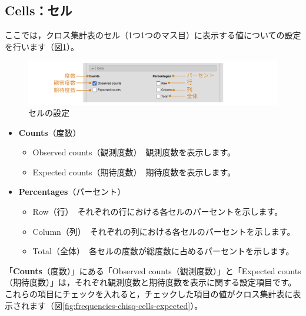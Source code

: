\documentclass[
  12pt,
  a5jpaper,
  lualatex, ja=standard]{bxjsbook}
\providecommand{\tightlist}{%
  \setlength{\itemsep}{0pt}\setlength{\parskip}{0pt}}
\newenvironment{jmvsettings}{%
	\begin{center}%
	\begin{tcolorbox}[%
		title=設定項目,
		colframe=gmoji,
		colbacktitle=gmoji,
		colback=gmoji!2!white,
		breakable,
		width=.9\textwidth,
		]\small\addtolength{\leftmargini}{-3\labelsep}%
	}%
	{\end{tcolorbox}\end{center}}
\begin{document}
\hypertarget{sub:frequencies-chisq-cells}{%
\subsection{Cells：セル}\label{sub:frequencies-chisq-cells}}

ここでは，クロス集計表のセル（1つ1つのマス目）に表示する値についての設定を行います（図\ref{fig:frequencies-chisq-cells}）。

\begin{figure}[!ht]

{\centering \includegraphics[width=1\linewidth]{images/frequencies/chisq-cells} 

}

\caption{セルの設定}\label{fig:frequencies-chisq-cells}
\end{figure}

\begin{jmvsettings}

\begin{itemize}
\tightlist
\item
  \textbf{Counts}（度数）

  \begin{itemize}
  \tightlist
  \item
    Observed counts（観測度数）　観測度数を表示します。
  \item
    Expected counts（期待度数）　期待度数を表示します。
  \end{itemize}
\item
  \textbf{Percentages}（パーセント）

  \begin{itemize}
  \tightlist
  \item
    Row（行）　それぞれの行における各セルのパーセントを示します。
  \item
    Column（列）　それぞれの列における各セルのパーセントを示します。
  \item
    Total（全体）　各セルの度数が総度数に占めるパーセントを示します。
  \end{itemize}
\end{itemize}

\end{jmvsettings}

「\textbf{Counts}（度数）」にある「Observed counts（観測度数）」と「Expected counts（期待度数）」は，それぞれ観測度数と期待度数を表示に関する設定項目です。これらの項目にチェックを入れると，チェックした項目の値がクロス集計表に表示されます（図\ref{fig:frequencies-chisq-cells-expected}）。
\end{document}
